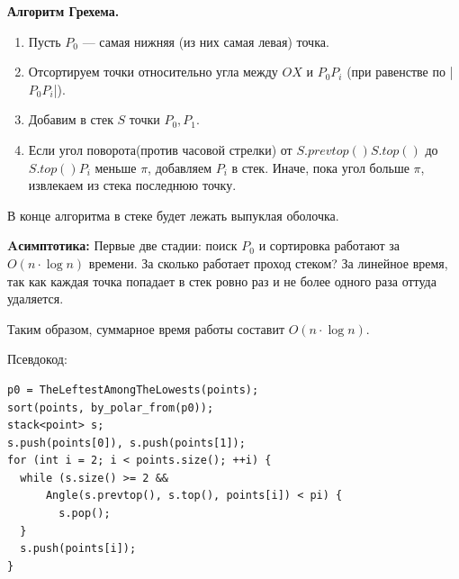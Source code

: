 \textbf{Алгоритм Грехема.} 
\begin{enumerate}
    \item Пусть $P_0$ — самая нижняя (из них самая левая) точка.
    \item Отсортируем точки относительно угла между $OX$ и $P_0P_i$ (при равенстве по |$P_0P_i$|).
    \item Добавим в стек $S$ точки $P_0, P_1$.
    \item Если угол поворота(против часовой стрелки) от $S.prevtop() S.top()$ до $S.top()P_i$ меньше $\pi$, добавляем $P_i$ в стек. Иначе, пока угол больше $\pi$, извлекаем из стека последнюю точку.
\end{enumerate}
В конце алгоритма в стеке будет лежать выпуклая оболочка.\newline


\textbf{Aсимптотика:} Первые две стадии: поиск $P_0$ и сортировка работают за $O(n\cdot\log n)$
времени. За сколько работает проход стеком? За линейное время, так как каждая точка попадает в стек ровно раз и не более одного раза оттуда удаляется.

Таким образом, суммарное время работы составит $O(n\cdot\log n)$.\newline

Псевдокод:
\begin{lstlisting}
p0 = TheLeftestAmongTheLowests(points);
sort(points, by_polar_from(p0));
stack<point> s;
s.push(points[0]), s.push(points[1]);
for (int i = 2; i < points.size(); ++i) {
  while (s.size() >= 2 &&
      Angle(s.prevtop(), s.top(), points[i]) < pi) {
        s.pop();
  }
  s.push(points[i]);
}
\end{lstlisting}
\pagebreak